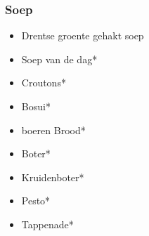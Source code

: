 \subsubsection*{Soep}
\begin{itemize}
	\item	Drentse groente gehakt soep
	\item	Soep van de dag*
	\item	Croutons*
	\item	Bosui*
	\item	boeren Brood*
	\item	Boter*
	\item	Kruidenboter*
	\item	Pesto*
	\item	Tappenade*
\end{itemize}
